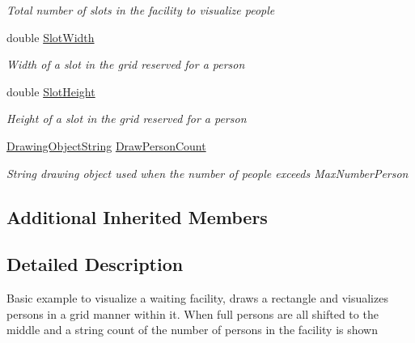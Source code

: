 \begin{DoxyCompactItemize}
\begin{DoxyCompactList}\small\item\em Total number of slots in the facility to visualize people \end{DoxyCompactList}\item 
double \hyperlink{class_simulation_w_p_f_visualization_tools_1_1_health_care_objects_1_1_draw_dynamic_holding_entity_a6432020604b25b838dfbc1f09d8abd9e}{Slot\+Width}
\begin{DoxyCompactList}\small\item\em Width of a slot in the grid reserved for a person \end{DoxyCompactList}\item 
double \hyperlink{class_simulation_w_p_f_visualization_tools_1_1_health_care_objects_1_1_draw_dynamic_holding_entity_a143880cf7abc3de5144b89cdce156526}{Slot\+Height}
\begin{DoxyCompactList}\small\item\em Height of a slot in the grid reserved for a person \end{DoxyCompactList}\item 
\hyperlink{class_w_p_f_visualization_base_1_1_drawing_object_string}{Drawing\+Object\+String} \hyperlink{class_simulation_w_p_f_visualization_tools_1_1_health_care_objects_1_1_draw_dynamic_holding_entity_ad66f38967b8767220e3fcc6f335dbbba}{Draw\+Person\+Count}
\begin{DoxyCompactList}\small\item\em String drawing object used when the number of people exceeds Max\+Number\+Person \end{DoxyCompactList}\end{DoxyCompactItemize}
\subsection*{Additional Inherited Members}


\subsection{Detailed Description}
Basic example to visualize a waiting facility, draws a rectangle and visualizes persons in a grid manner within it. When full persons are all shifted to the middle and a string count of the number of persons in the facility is shown 



